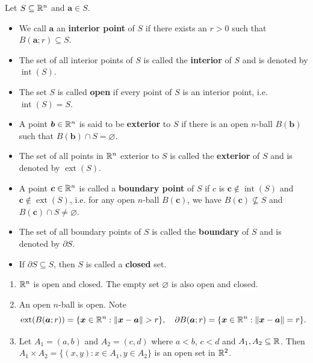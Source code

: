     \begin{definitionenv}
        Let $S\subseteq \mathbb{R}^n$ and $\bm a \in S$.
        \begin{itemize}
            \item We call $\bm a $ an \textbf{interior point} of $S$ if there exists an $r>0$ such that $B(\bm a; r) \subseteq S$.
            \item The set of all interior points of $S$ is called the \textbf{interior} of $S$ and is denoted by $\operatorname{int}(S)$.
            \item The set $S$ is called \textbf{open} if every point of $S$ is an interior point, i.e. $\operatorname{int}(S) = S$.
            \item A point $\bm b\in \mathbb{R}^n$ is said to be \textbf{exterior} to $S$ if there is an open $n$-ball $B(\bm b)$ such that $B(\bm b) \cap S = \varnothing$.
            \item The set of all points in $\mathbb{R}^n$ exterior to $S$ is called the \textbf{exterior} of $S$ and is denoted by $\operatorname{ext}(S)$.
            \item A point $\bm c\in \mathbb{R}^n$ is called a \textbf{boundary point} of $S$ if $c$ is $\bm c \notin \operatorname{int}(S)$ and $\bm c \notin \operatorname{ext}(S)$, i.e. for any open $n$-ball $B(\bm c)$, we have $B(\bm c) \nsubseteq S$ and $B(\bm c) \cap S \ne \varnothing$.
            \item The set of all boundary points of $S$ is called the \textbf{boundary} of $S$ and is denoted by $\partial S$.
            \item If $\partial S \subseteq S$, then $S$ is called a \textbf{closed} set.
        \end{itemize}
    \end{definitionenv}
    \begin{exampleenv}
        \begin{enumerate}[label=(\arabic*),start=0]
            \item $\mathbb{R}^n$ is open and closed. The empty set $\varnothing$ is also open and closed.
            \item An open $n$-ball is open. Note
            $$ \operatorname{ext}(B(\bm a; r)) = \{ \bm x\in \mathbb{R}^n : \| \bm x - \bm a\| > r\}, \quad \partial B(\bm a; r) = \{ \bm x\in \mathbb{R}^n : \| \bm x - \bm a\| = r\}. $$
            \item Let $A_1 = (a,b)$ and $A_2 = (c,d)$ where $a<b$, $c<d$ and $A_1, A_2 \subseteq \mathbb{R}$. Then $A_1\times A_2 = \{ (x,y) : x\in A_1, y\in A_2\}$ is an open set in $\mathbb{R}^2$.
        \end{enumerate}
    \end{exampleenv}
